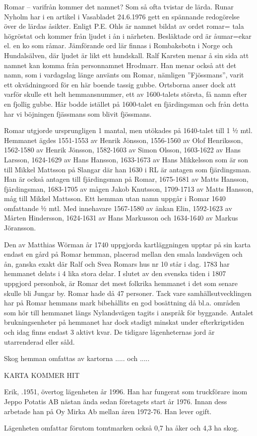 
Romar – varifrån kommer det namnet? Som så ofta tvistar de lärda. Runar Nyholm har i en artikel i Vasabladet 24.6.1976 gett en spännande redogörelse över de lärdas åsikter. Enligt P.E. Ohls är namnet bildat av ordet romar= tala högröstat och kommer från ljudet i ån i närheten. Besläktade ord är åumar=ekar el. en ko som råmar. Jämförande ord lär finnas i Rombaksbotn i Norge och Hundalsälven, där ljudet är likt ett hundskall. Ralf Karsten menar å sin sida att namnet kan komma från personnamnet Hrodmarr. Han menar också att det namn, som i vardagslag länge använts om Romar, nämligen ”Fjössmans”, varit ett okvädningsord för en här boende tassig gubbe. Ortsborna anser dock att varför skulle ett helt hemmansnummer, ett av 1600-talets största, få namn efter en fjollig gubbe. Här bodde istället på 1600-talet en fjärdingsman och från detta har vi böjningen fjässmans som blivit fjössmans.

Romar utgjorde ursprungligen 1 mantal, men utökades på 1640-talet till 1 ½ mtl. Hemmanet ägdes 1551-1553 av Henrik Jönsson,  1556-1560 av Olof Henriksson, 1562-1580 av Henrik Jönsson, 1582-1603 av Simon Olsson, 1603-1622 av Hans Larsson, 1624-1629 av Hans Hansson, 1633-1673 av Hans Mikkelsson som är son till Mikkel Mattsson på Slangar där han 1630 i RL är antagen som fjärdingsman. Han är också antagen till fjärdingsman på Romar, 1675-1681 av Matts Hansson, fjärdingsman, 1683-1705 av mågen  Jakob Knutsson, 1709-1713 av Matts Hansson, måg till Mikkel Mattsson. Ett hemman utan namn uppgår i Romar 1640 omfattande ½ mtl. Med innehavare 1567-1580 av änkan Elin, 1592-1623 av Mårten Hindersson, 1624-1631 av Hans Markusson och 1634-1640 av Markus Jöransson.

Den av Matthias Wörman år 1740 uppgjorda kartläggningen upptar på sin karta endast en gård på Romar hemman, placerad mellan den smala landsvägen och ån, ganska exakt där Ralf och Svea Romars hus nr 10 står i dag.  1783 har hemmanet delats i 4 lika stora delar. I slutet av den svenska tiden i 1807 uppgjord personbok, är Romar det mest folkrika hemmanet i det som senare  skulle bli Jungar by.  Romar hade då 47 personer. Tack vare samhällsutvecklingen har på Romar hemmans mark bibehållits en god bosättning då bl.a. områden som hör till hemmanet längs Nylandsvägen tagits i anspråk för byggande. Antalet brukningsenheter på hemmanet har dock stadigt minskat under efterkrigstiden och idag finns endast 3 aktivt kvar. De tidigare lägenheternas jord är utarrenderad eller såld.

Skog hemman omfattas av kartorna ..... och .....


KARTA KOMMER HIT




Erik, .1951, övertog lägenheten år 1996. Han har fungerat som truckförare inom Jeppo Potatis AB nästan ända sedan företagets start år 1976. Innan dess arbetade han på Oy Mirka Ab mellan åren 1972-76. Han lever ogift.

Lägenheten omfattar förutom tomtmarken också 0,7 ha åker och 4,3 ha skog.
